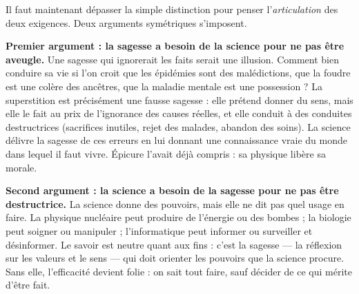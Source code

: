 \documentclass[11pt]{article}
\begin{document}
Il faut maintenant dépasser la simple distinction pour penser l'\emph{articulation} des deux exigences. Deux arguments symétriques s'imposent.

\textbf{Premier argument : la sagesse a besoin de la science pour ne pas être aveugle.} Une sagesse qui ignorerait les faits serait une illusion. Comment bien conduire sa vie si l'on croit que les épidémies sont des malédictions, que la foudre est une colère des ancêtres, que la maladie mentale est une possession ? La superstition est précisément une fausse sagesse : elle prétend donner du sens, mais elle le fait au prix de l'ignorance des causes réelles, et elle conduit à des conduites destructrices (sacrifices inutiles, rejet des malades, abandon des soins). La science délivre la sagesse de ces erreurs en lui donnant une connaissance vraie du monde dans lequel il faut vivre. Épicure l'avait déjà compris : sa physique libère sa morale.

\textbf{Second argument : la science a besoin de la sagesse pour ne pas être destructrice.} La science donne des pouvoirs, mais elle ne dit pas quel usage en faire. La physique nucléaire peut produire de l'énergie ou des bombes ; la biologie peut soigner ou manipuler ; l'informatique peut informer ou surveiller et désinformer. Le savoir est neutre quant aux fins : c'est la sagesse — la réflexion sur les valeurs et le sens — qui doit orienter les pouvoirs que la science procure. Sans elle, l'efficacité devient folie : on sait tout faire, sauf décider de ce qui mérite d'être fait.
\end{document}
